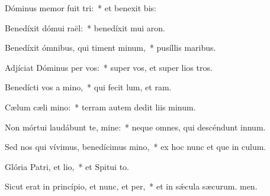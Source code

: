 \item Dóminus memor fuit tri:~* et benexit bis:
\item Benedíxit dómui raël:~* benedíxit mui aron.
\item Benedíxit ómnibus, qui timent minum,~* pusíllis  maribus.
\item Adjíciat Dóminus per vos:~* super vos, et super lios tros.
\item Benedícti vos a mino,~* qui fecit lum, et ram.
\item Cælum cæli mino:~* terram autem dedit liis minum.
\item Non mórtui laudábunt te, mine:~* neque omnes, qui descéndunt  innum.
\item Sed nos qui vívimus, benedícimus mino,~* ex hoc nunc et que in culum.
\item Glória Patri, et lio,~* et Spitui to.
\item Sicut erat in princípio, et nunc, et per,~* et in sǽcula sæcurum. men.
